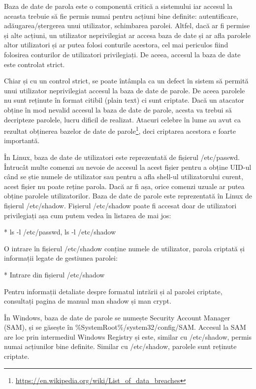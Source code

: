 Baza de date de parola este o componentă critică a sistemului iar accesul la
aceasta trebuie să fie permis numai pentru acțiuni bine definite: autentificare,
adăugarea/ștergerea unui utilizator, schimbarea parolei. Altfel, dacă ar fi
permise și alte acțiuni, un utilizator neprivilegiat ar accesa baza de date și
ar afla parolele altor utilizatori și ar putea folosi conturile acestora, cel
mai periculos fiind folosirea conturilor de utilizatori privilegiați. De aceea,
accesul la baza de date este controlat strict.

Chiar și cu un control strict, se poate întâmpla ca un defect în sistem să
permită unui utilizator neprivilegiat accesul la baza de date de parole. De
aceea parolele nu sunt reținute în format citibil (plain text) ci sunt criptate.
Dacă un atacator obține în mod nevalid accesul la baza de date de parole, acesta
va trebui să decripteze parolele, lucru dificil de realizat. Atacuri celebre în
lume au avut ca rezultat obținerea bazelor de date de
parole\footnote{\url{https://en.wikipedia.org/wiki/List_of_data_breaches}}, deci
criptarea acestora e foarte importantă.

În Linux, baza de date de utilizatori este reprezentată de fișierul /etc/passwd.
Întrucât multe comenzi au nevoie de accesul la acest fișier pentru a obține
UID-ul când se știe numele de utilizator sau pentru a afla shell-ul
utilizatorului curent, acest fișier nu poate reține parola. Dacă ar fi așa,
orice comenzi uzuale ar putea obține parolele utilizatorilor. Baza de date de
parole este reprezentată în Linux de fișierul /etc/shadow. Fișierul /etc/shadow
poate fi accesat doar de utilizatori privilegiați așa cum putem vedea în
listarea de mai jos:

* ls -l /etc/passwd, ls -l /etc/shadow

O intrare în fișierul /etc/shadow conține numele de utilizator, parola criptată
și informații legate de gestiunea parolei:

* Intrare din fișierul /etc/shadow

Pentru informații detaliate despre formatul intrării și al parolei criptate, consultați pagina de manual man shadow și man crypt.

În Windows, baza de date de parole se numește Security Account Manager (SAM), și
se găsește în \%SystemRoot\%/system32/config/SAM. Accesul la SAM are loc prin
intermediul Windows Registry și este, similar cu /etc/shadow, permis numai
acțiunilor bine definite. Similar cu /etc/shadow, parolele sunt reținute
criptate.

